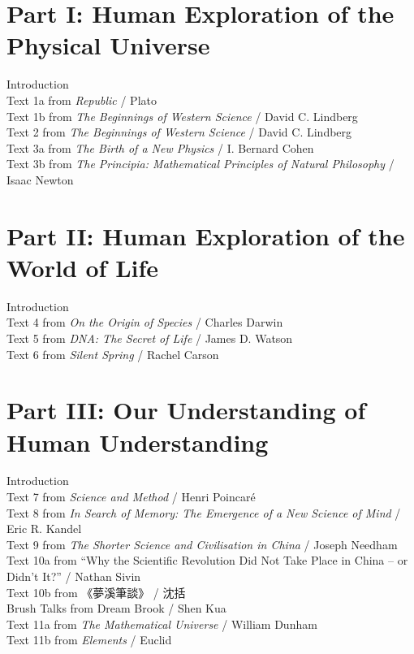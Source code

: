 \section*{Part I: Human Exploration of the Physical Universe}
\noindent Introduction \\
Text 1a from \textit{Republic} / Plato \\
Text 1b from \textit{The Beginnings of Western Science} / David C. Lindberg \\
Text 2 from \textit{The Beginnings of Western Science} / David C. Lindberg \\
Text 3a from \textit{The Birth of a New Physics} / I. Bernard Cohen \\
Text 3b from \textit{The Principia: Mathematical Principles of Natural Philosophy} / Isaac Newton 

\section*{Part II: Human Exploration of the World of Life}
\noindent Introduction \\
Text 4 from \textit{On the Origin of Species} / Charles Darwin \\
Text 5 from \textit{DNA: The Secret of Life} / James D. Watson \\
Text 6 from \textit{Silent Spring} / Rachel Carson 

\section*{Part III: Our Understanding of Human Understanding}
\noindent Introduction \\
Text 7 from \textit{Science and Method} / Henri Poincaré \\
Text 8 from \textit{In Search of Memory: The Emergence of a New Science of Mind} / Eric R. Kandel \\
Text 9 from \textit{The Shorter Science and Civilisation in China} / Joseph Needham \\
Text 10a from ``Why the Scientific Revolution Did Not Take Place in China -- or Didn't It?'' / Nathan Sivin \\
Text 10b from 《夢溪筆談》 / 沈括 \\
Brush Talks from Dream Brook / Shen Kua \\
Text 11a from \textit{The Mathematical Universe} / William Dunham \\
Text 11b from \textit{Elements} / Euclid 



